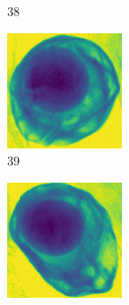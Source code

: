 \documentclass[11pt]{article}
\begin{document}
\begin{figure}[!h]
\begin{subfigure}[b]{0.22\textwidth}
         \caption{38}
         \label{fig:avo_37}
     \end{subfigure}
     \hfill
     \begin{subfigure}[b]{0.22\textwidth}
         \centering
         \includegraphics[width=\textwidth]{figurer/avocado_dataset/avo_38.jpg}
         \caption{39}
         \label{fig:avo_38}
     \end{subfigure}
     \hfill
     \begin{subfigure}[b]{0.22\textwidth}
         \centering
         \includegraphics[width=\textwidth]{figurer/avocado_dataset/avo_39.jpg}

\end{subfigure}
\end{figure}
\end{document}
